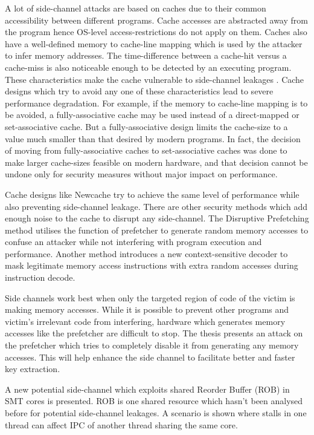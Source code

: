 A lot of side-channel attacks are based on caches due to their common
accessibility between different programs. Cache accesses are abstracted away
from the program hence OS-level access-restrictions do not apply on them.
Caches also have a well-defined memory to cache-line mapping which is used
by the attacker to infer memory addresses. The time-difference between
a cache-hit versus a cache-miss is also noticeable enough to be detected
by an executing program. These characteristics make the cache vulnerable to
side-channel leakages .
Cache designs which try to avoid any one of these characteristics lead to severe
performance degradation. For example, if the memory to cache-line mapping is to be
avoided, a fully-associative cache may be used instead of a direct-mapped
or set-associative cache. But a fully-associative design limits the cache-size
to a value much smaller than that desired by modern programs. In fact, the decision
of moving from fully-associative caches to set-associative caches was done
to make larger cache-sizes feasible on modern hardware, and that decision cannot
be undone only for security measures without major impact on performance.

Cache designs like Newcache  try to achieve the same level
of performance while also preventing side-channel leakage.
There are other security methods which add enough noise
to the cache to disrupt any side-channel.
The Disruptive Prefetching  method utilises
the function of prefetcher to generate random memory accesses to confuse an attacker
while not interfering with program execution and performance.
Another method introduces a new context-sensitive decoder 
to mask legitimate memory access instructions with extra random accesses during
instruction decode.

Side channels work best when only the targeted region of code of the victim
is making memory accesses. While it is possible to prevent other programs and
victim's irrelevant code from interfering, hardware which generates memory
accesses like the prefetcher are difficult to stop. The thesis presents an
attack on the prefetcher which tries to completely disable it from
generating any memory accesses. This will help enhance the side channel
to facilitate better and faster key extraction.

A new potential side-channel which exploits shared Reorder Buffer (ROB) in
SMT cores is presented. ROB is one shared resource which hasn't been analysed
before for potential side-channel leakages. A scenario is shown where stalls in
one thread can affect IPC of another thread sharing the same core.

